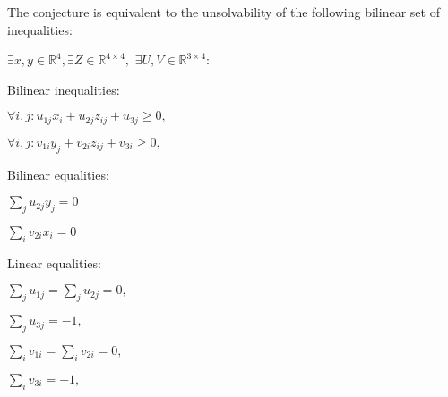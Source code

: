 \documentclass{article}
\begin{document}
The conjecture is equivalent to the unsolvability of the following bilinear set of inequalities:

\vspace{10px}

$\exists x, y \in \mathbb{R}^{4}, \exists Z \in \mathbb{R}^{4 \times 4},$
$\exists U, V \in \mathbb{R}^{3 \times 4}:$

\vspace{10px}

Bilinear inequalities:

$\forall i, j: u_{1j} x_i + u_{2j} z_{ij} + u_{3j} \geq 0,$

$\forall i, j: v_{1i} y_j + v_{2i} z_{ij} + v_{3i} \geq 0,$

\vspace{10px}

Bilinear equalities:

$\sum_j u_{2j} y_j = 0$

$\sum_i v_{2i} x_i = 0$

\vspace{10px}

Linear equalities:

$\sum_j u_{1j} = \sum_j u_{2j} = 0,$

$\sum_j u_{3j} = -1,$

$\sum_i v_{1i} = \sum_i v_{2i} = 0,$

$\sum_i v_{3i} = -1,$
\end{document}
